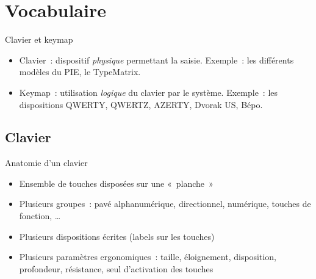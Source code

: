 \section{Vocabulaire}

\begin{frame}{Clavier et keymap}
  \begin{itemize}
    \item Clavier~: dispositif \emph{physique} permettant la saisie. Exemple~:
      les différents modèles du PIE, le TypeMatrix. \pause

    \item Keymap~: utilisation \emph{logique} du clavier par le
      système. Exemple~: les dispositions QWERTY, QWERTZ, AZERTY, Dvorak US,
      Bépo.
  \end{itemize}
\end{frame}



\subsection{Clavier}

\begin{frame}{Anatomie d’un clavier}
  \begin{itemize}
    \item Ensemble de touches disposées sur une «~planche~» \pause

    \item Plusieurs groupes~: pavé alphanumérique, directionnel, numérique,
      touches de fonction, … \pause

    \item Plusieurs dispositions écrites (labels sur les touches) \pause

    \item Plusieurs paramètres ergonomiques~: taille, éloignement, disposition,
      profondeur, résistance, seul d’activation des touches
  \end{itemize}
\end{frame}

